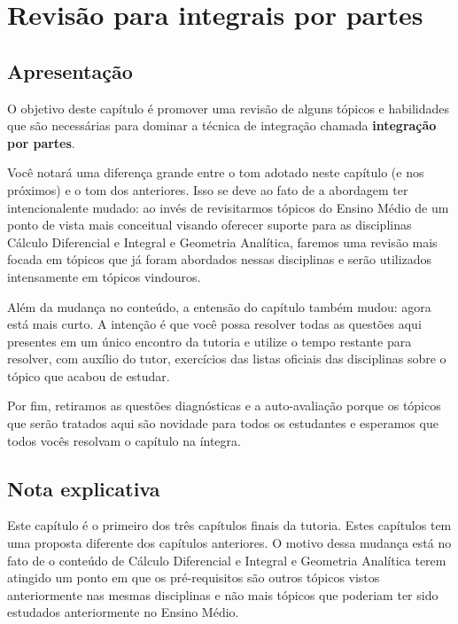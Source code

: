\documentclass[main_estudante.tex]{subfiles}
\begin{document}
\paraAmbos

\chapter{Revisão para integrais por partes}

\section{Apresentação}

O objetivo deste capítulo é promover uma revisão de alguns tópicos e habilidades que são necessárias para dominar a técnica de integração chamada \textbf{integração por partes}.

Você notará uma diferença grande entre o tom adotado neste capítulo (e nos próximos) e o tom dos anteriores. Isso se deve ao fato de a abordagem ter intencionalente mudado: ao invés de revisitarmos tópicos do Ensino Médio de um ponto de vista mais conceitual visando oferecer suporte para as disciplinas Cálculo Diferencial e Integral e Geometria Analítica, faremos uma revisão mais focada em tópicos que já foram abordados nessas disciplinas e serão utilizados intensamente em tópicos vindouros.

Além da mudança no conteúdo, a entensão do capítulo também mudou: agora está mais curto. A intenção é que você possa resolver todas as questões aqui presentes em um único encontro da tutoria e utilize o tempo restante para resolver, com auxílio do tutor, exercícios das listas oficiais das disciplinas sobre o tópico que acabou de estudar.

Por fim, retiramos as questões diagnósticas e a auto-avaliação porque os tópicos que serão tratados aqui são novidade para todos os estudantes e esperamos que todos vocês resolvam o capítulo na íntegra.

\paraTutores

\section{Nota explicativa}

Este capítulo é o primeiro dos três capítulos finais da tutoria. Estes capítulos tem uma proposta diferente dos capítulos anteriores. O motivo dessa mudança está no fato de o conteúdo de Cálculo Diferencial e Integral e Geometria Analítica terem atingido um ponto em que os pré-requisitos são outros tópicos vistos anteriormente nas mesmas disciplinas e não mais tópicos que poderiam ter sido estudados anteriormente no Ensino Médio.
\end{document}
